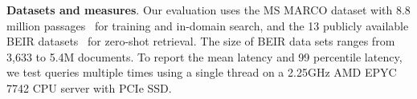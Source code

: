 {\bf Datasets and measures}.
Our evaluation uses the MS MARCO dataset with 8.8 million passages~\cite{Campos2016MSMARCO,Craswell2020OverviewOT} 
for training and in-domain search,
and the  13 publicly available BEIR datasets~\cite{thakur2021beir} 
for zero-shot retrieval. 
The size of BEIR data sets ranges from 3,633 to 5.4M documents.
To report the mean latency and 99 percentile latency, 
we test queries multiple times using a single thread on  a 2.25GHz AMD EPYC 7742  CPU server with PCIe SSD.

